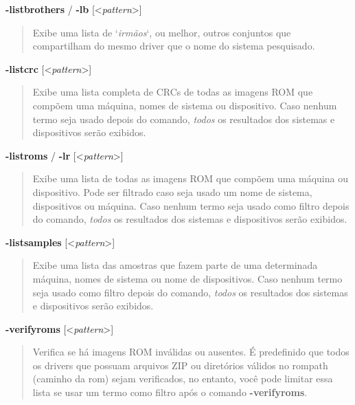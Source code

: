 \documentclass[letterpaper,10pt,brazil]{sphinxmanual}
\begin{document}
\label{commandline/commandline-all:mame-commandline-listbrothers}
\textbf{-listbrothers} / \textbf{-lb} {[}\textless{}\emph{pattern}\textgreater{}{]}
\begin{quote}

Exibe uma lista de `\emph{irmãos}`, ou melhor, outros conjuntos que
compartilham do mesmo driver que o nome do sistema pesquisado.
\end{quote}
\label{commandline/commandline-all:mame-commandline-listcrc}
\textbf{-listcrc} {[}\textless{}\emph{pattern}\textgreater{}{]}
\begin{quote}

Exibe uma lista completa de CRCs de todas as imagens ROM
que compõem uma máquina, nomes de sistema ou dispositivo.
Caso nenhum termo seja usado depois do comando, \emph{todos} os
resultados dos sistemas e dispositivos serão exibidos.
\end{quote}
\label{commandline/commandline-all:mame-commandline-listroms}
\textbf{-listroms} / \textbf{-lr} {[}\textless{}\emph{pattern}\textgreater{}{]}
\begin{quote}

Exibe uma lista de todas as imagens ROM que compõem uma máquina ou
dispositivo. Pode ser filtrado caso seja usado um nome de sistema,
dispositivos ou máquina. Caso nenhum termo seja usado como filtro
depois do comando, \emph{todos} os resultados dos sistemas e dispositivos
serão exibidos.
\end{quote}
\label{commandline/commandline-all:mame-commandline-listsamples}
\textbf{-listsamples} {[}\textless{}\emph{pattern}\textgreater{}{]}
\begin{quote}

Exibe uma lista das amostras que fazem parte de uma determinada
máquina, nomes de sistema ou nome de dispositivos. Caso nenhum termo
seja usado como filtro depois do comando, \emph{todos} os resultados dos
sistemas e dispositivos serão exibidos.
\end{quote}
\label{commandline/commandline-all:mame-commandline-verifyroms}
\textbf{-verifyroms} {[}\textless{}\emph{pattern}\textgreater{}{]}
\begin{quote}

Verifica se há imagens ROM inválidas ou ausentes. É predefinido que
todos os drivers que possuam arquivos ZIP ou diretórios válidos no
rompath (caminho da rom) sejam verificados, no entanto, você pode
limitar essa lista se usar um termo como filtro após o comando
\textbf{-verifyroms}.
\end{quote}
\end{document}
